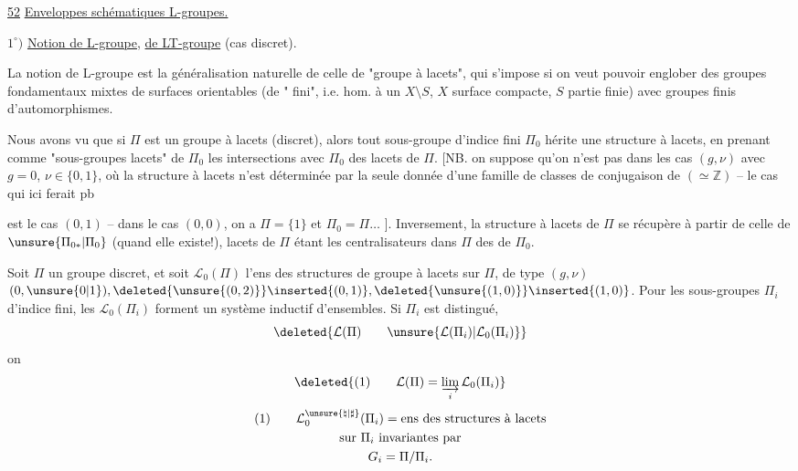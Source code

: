 \uline{52}\qquad
\uline{Enveloppes schématiques  L-groupes.}

$1^\circ)$ \uline{Notion de L-groupe}, \uline{de LT-groupe} (cas discret).

La notion de L-groupe est la généralisation
naturelle de celle de "groupe à lacets",
qui s'impose si on veut pouvoir englober
des groupes fondamentaux mixtes de
surfaces orientables (de " fini", i.e.
hom. à un $X\setminus S$, $X$ surface compacte,
$S$ partie finie) avec groupes finis d'automorphismes.

Nous avons vu que si $\Pi$ est un
groupe à lacets (discret), alors tout sous-groupe
d'indice fini $\Pi_0$ hérite une
structure à lacets, en prenant comme
"sous-groupes lacets" de $\Pi_0$ les intersections
avec $\Pi_0$ des  lacets de $\Pi$. [NB. on
suppose qu'on n'est pas dans les cas
$(g,\nu)$  avec $g=0$, $\nu\in\{0,1\}$, où la structure à lacets
n'est  déterminée par la seule donnée d'une
famille de classes de conjugaison de 
 $(\simeq\mathbb Z)$ -- le  cas qui ici ferait pb

est le cas $(0,1)$  -- dans le cas $(0,0)$, on a $\Pi=\{1\}$
et $\Pi_0=\Pi\ldots$ ]. Inversement, la structure
à lacets de $\Pi$ se récupère à partir de
celle de $\unsure{\Pi_{0*}|\Pi_0}$ (quand elle existe!), 
 lacets de $\Pi$ étant les centralisateurs
dans $\Pi$ des  de $\Pi_0$.

Soit $\Pi$ un groupe discret,
 et
soit $\mathcal L_0(\Pi)$ l'ens des structures de groupe
à lacets sur $\Pi$, de type $(g,\nu)$
$(0,\unsure{0|1}),
\deleted{\unsure{(0,2)}}\inserted{(0,1)},
\deleted{\unsure{(1,0)}}\inserted{(1,0)}$.
Pour les sous-groupes  $\Pi_i$  d'indice fini,
les $\mathcal L_0(\Pi_i)$ forment un système inductif
d'ensembles.  Si $\Pi_i$ est distingué,
\[
\deleted{\mathcal L(\Pi)\qquad
\unsure{\mathcal L(\Pi_i)|\mathcal L_0(\Pi_i)}}
\]
on  
\[
\deleted{\text{(1)}\qquad
\mathcal L(\Pi)=\varinjlim_i\mathcal L_0(\Pi_i)}
\]
\[
\begin{gathered}
\text{(1)}\qquad
\mathcal L_0^{\unsure{\natural|\sharp}}(\Pi_i)=
\text{ens des structures à lacets}\\
\text{sur }\Pi_i\text{ invariantes par}\\
G_i=\Pi/\Pi_i.
\end{gathered}
\]

